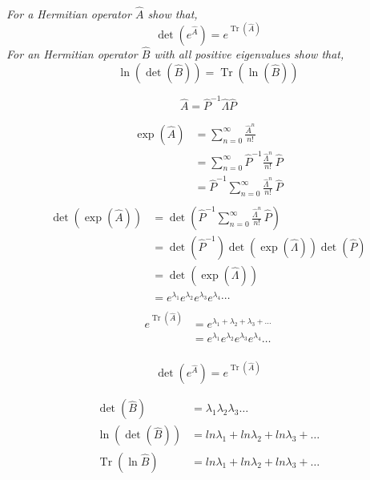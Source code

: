 \documentclass[12pt, letterpaper]{article}
\begin{document}
\subsection{}
\textit{For a Hermitian operator $\hat{A}$ show that,
$$
\operatorname{det}\left(e^{\hat{A}}\right)=e^{\operatorname{Tr}(\hat{A})}
$$
For an Hermitian operator $\hat{B}$ with all positive eigenvalues show that,
$$
\ln (\operatorname{det}(\hat{B}))=\operatorname{Tr}(\ln (\hat{B}))
$$
}

$$
\hat A = \hat{P}^{-1} \hat \Lambda \hat P
$$

\begin{align*}
    \exp\left(\hat A\right) & = \sum_{n=0}^\infty \frac{\hat{A}^n} {n!} \\ 
    &= \sum_{n=0}^\infty  \hat{P}^{-1} \frac{\hat{\Lambda}^n} {n!}\, \hat{P}\\
    &= \hat{P}^{-1} \sum_{n=0}^\infty  \frac{\hat{\Lambda}^n} {n!}\, \hat{P}\\
\end{align*}
\begin{align*}
    \operatorname{det}\left(\exp\left(\hat A\right) \right)&= \operatorname{det}\left(\hat{P}^{-1} \sum_{n=0}^\infty  \frac{\hat{\Lambda}^n} {n!}\, \hat{P} \right)\\
    &= \operatorname{det}\left(\hat{P}^{-1}\right)\operatorname{det}\left(\exp\left(\hat \Lambda\right)\right)\operatorname{det}\left(\hat{P}\right)\\
    &= \operatorname{det}\left(\exp\left(\hat \Lambda\right)\right)\\
    &= e^{\lambda_1}e^{\lambda_2}e^{\lambda_3}e^{\lambda_4}\cdots\\
\end{align*}
\begin{align*}
    e^{\operatorname{Tr} \left(\hat A\right)}&=e^{\lambda_1+\lambda_2+\lambda_3+\ldots} \\
    &= e^{\lambda_1}e^{\lambda_2}e^{\lambda_3}e^{\lambda_4}\ldots\\
\end{align*}

\begin{equation*}\boxed{
    \operatorname{det}\left(e^{\hat{A}}\right)=e^{\operatorname{Tr}(\hat{A})}}
\end{equation*}

\begin{align*}
    \operatorname{det}\left(\hat B \right) &= \lambda_1 \lambda_2 \lambda_3 \ldots\\
    \ln\left(\operatorname{det}\left(\hat B \right)\right) & = ln \lambda_1+ ln \lambda_2+ ln \lambda_3+\ldots\\
    \operatorname{Tr}\left( \ln{\hat B} \right) &=  ln \lambda_1+ ln \lambda_2+ ln \lambda_3+\ldots
\end{align*}
\end{document}
